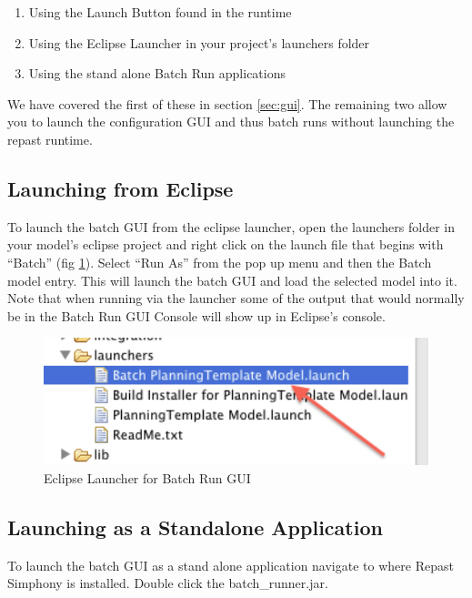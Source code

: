 \documentclass[11pt]{amsart}
\begin{document}
\begin{enumerate}
\item Using the Launch Button found in the runtime
\item Using the Eclipse Launcher in your project's launchers folder
\item Using the stand alone Batch Run applications
\end{enumerate}
\noindent
We have covered the first of these in section \ref{sec:gui}. The remaining two allow you to launch the configuration GUI and thus batch runs without launching the repast runtime.

\subsection{Launching from Eclipse}
To launch the batch GUI from the eclipse launcher, open the launchers folder in your model's eclipse project and right click on the launch file that begins with ``Batch'' (fig \ref{fig:launcher}). Select ``Run As'' from the pop up menu and then the Batch model entry. This will launch the batch GUI and load the selected model into it. Note that when running via the launcher some of the output that would normally be in the Batch Run GUI Console will show up in Eclipse's console.

\begin{figure}[h]
\begin{center}
\vspace{.2in}
\centerline {
\includegraphics[width=6in]{images/batch_run_launcher.png}
}
\caption{Eclipse Launcher for Batch Run GUI}
\label{fig:launcher}
\end{center}
\end{figure}

\subsection{Launching as a Standalone Application}
To launch the batch GUI as a stand alone application navigate to where Repast Simphony is installed. Double click the batch\_runner.jar.
\end{document}
